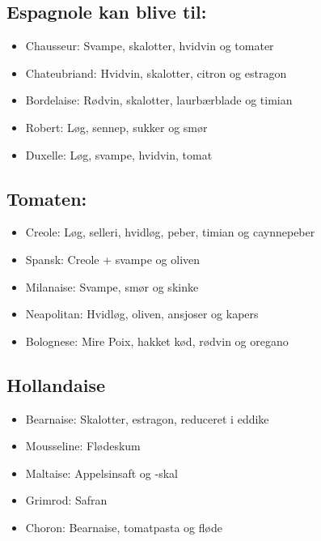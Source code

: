 \documentclass[
]{book}
\providecommand{\tightlist}{%
  \setlength{\itemsep}{0pt}\setlength{\parskip}{0pt}}
\begin{document}
\subsection{Espagnole kan blive til:}\label{espagnole-kan-blive-til}

\begin{itemize}
\tightlist
\item
  Chausseur: Svampe, skalotter, hvidvin og tomater
\item
  Chateubriand: Hvidvin, skalotter, citron og estragon
\item
  Bordelaise: Rødvin, skalotter, laurbærblade og timian
\item
  Robert: Løg, sennep, sukker og smør
\item
  Duxelle: Løg, svampe, hvidvin, tomat
\end{itemize}

\subsection{Tomaten:}\label{tomaten}

\begin{itemize}
\tightlist
\item
  Creole: Løg, selleri, hvidløg, peber, timian og caynnepeber
\item
  Spansk: Creole + svampe og oliven
\item
  Milanaise: Svampe, smør og skinke
\item
  Neapolitan: Hvidløg, oliven, ansjoser og kapers
\item
  Bolognese: Mire Poix, hakket kød, rødvin og oregano
\end{itemize}

\subsection{Hollandaise}\label{hollandaise}

\begin{itemize}
\tightlist
\item
  Bearnaise: Skalotter, estragon, reduceret i eddike
\item
  Mousseline: Flødeskum
\item
  Maltaise: Appelsinsaft og -skal
\item
  Grimrod: Safran
\item
  Choron: Bearnaise, tomatpasta og fløde
\end{itemize}
\end{document}
